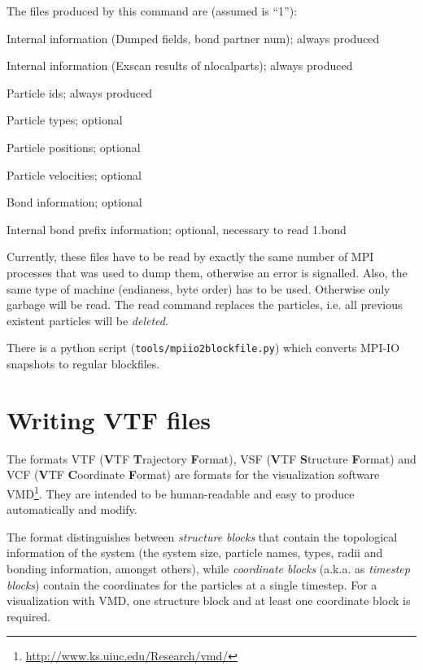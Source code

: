 The files produced by this command are (assumed  is
``1''):
\begin{description}[align=right,labelwidth=2cm]
  \item [1.head] Internal information (Dumped fields, bond partner num); always produced
  \item [1.pref] Internal information (Exscan results of nlocalparts);
    always produced
  \item [1.ids] Particle ids; always produced
  \item [1.type] Particle types; optional
  \item [1.pos] Particle positions; optional
  \item [1.vel] Particle velocities; optional
  \item [1.bond] Bond information; optional
  \item [1.boff] Internal bond prefix information; optional, necessary
    to read 1.bond
\end{description}

Currently, these files have to be read by exactly the same number of MPI
processes that was used to dump them, otherwise an error is
signalled. Also, the same type of machine (endianess, byte order) has to
be used. Otherwise only garbage will be read. The read command replaces
the particles, i.e. all previous existent particles will be
\textit{deleted}.

There is a python script (\texttt{tools/mpiio2blockfile.py}) which
converts MPI-IO snapshots to regular \es blockfiles.


\section{Writing VTF files}
\label{sec:vtf}

The formats VTF (\textbf{V}TF \textbf{T}rajectory \textbf{F}ormat),
VSF (\textbf{V}TF \textbf{S}tructure \textbf{F}ormat) and VCF
(\textbf{V}TF \textbf{C}oordinate \textbf{F}ormat) are formats for the
visualization software
VMD\cite{humphrey96a}\footnote{\url{http://www.ks.uiuc.edu/Research/vmd/}}. They
are intended to be human-readable and easy to produce automatically
and modify.

The format distinguishes between \emph{structure blocks} that contain
the topological information of the system (\ie the system size,
particle names, types, radii and bonding information, amongst others),
while \emph{coordinate blocks} (a.k.a. as \emph{timestep blocks})
contain the coordinates for the particles at a single timestep.  For a
visualization with VMD, one structure block and at least one
coordinate block is required.

